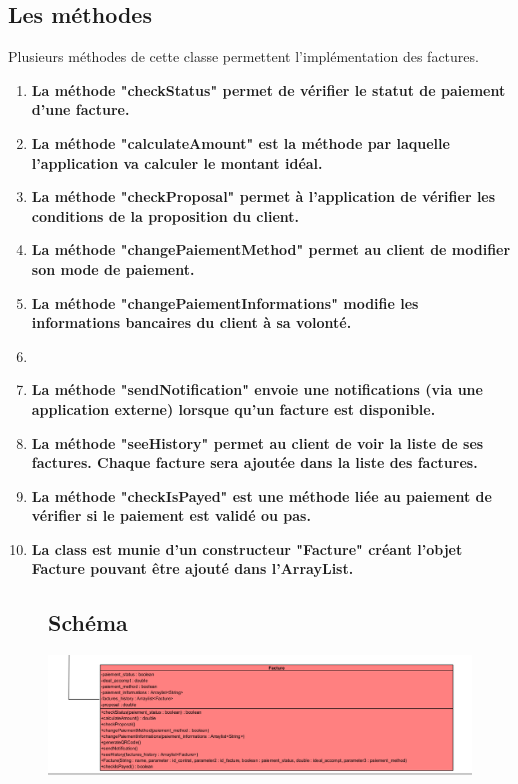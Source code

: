 \subsection{Les méthodes}
\begin{flushleft}
Plusieurs méthodes de cette classe permettent l'implémentation des factures.
\end{flushleft}

\begin{enumerate}[-]

\item \textbf{La méthode "checkStatus" permet de vérifier le statut de paiement d'une facture.}

\item \textbf{La méthode "calculateAmount" est la méthode par laquelle l'application va calculer le montant idéal.}

\item \textbf{La méthode "checkProposal" permet à l'application de vérifier les conditions de la proposition du client.}

\item \textbf{La méthode "changePaiementMethod" permet au client de modifier son mode de paiement.}

\item \textbf{La méthode "changePaiementInformations" modifie les informations bancaires du client à sa volonté.}

\item {}

\item \textbf{La méthode "sendNotification" envoie une notifications (via une application externe) lorsque qu'un facture est disponible.}

\item \textbf{La méthode "seeHistory" permet au client de voir la liste de ses factures. Chaque facture sera ajoutée dans la liste des factures.}

\item \textbf{La méthode "checkIsPayed" est une méthode liée au paiement de vérifier si le paiement est validé ou pas.}

\item \textbf{La class est munie d'un constructeur "Facture" créant l'objet Facture pouvant être ajouté dans l'ArrayList.}

\end{enumerate}

\begin{figure}[h]
\subsection{Schéma}
\centering
\includegraphics[width = 1\textwidth]{extension-maxime/class/img/class-extension.png}
\end{figure}



